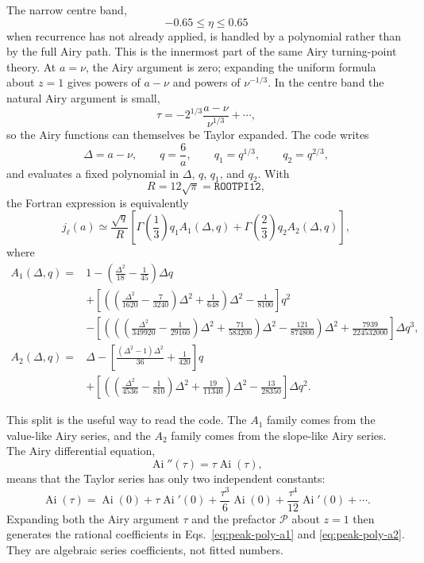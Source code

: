 \documentclass[11pt,a4paper]{article}
\newcommand{\Ai}{\operatorname{Ai}}
\newcommand{\Aip}{\operatorname{Ai}'}
\newcommand{\code}[1]{\texttt{#1}}
\newcommand{\D}{\Delta}
\begin{document}
The narrow centre band,
\begin{equation}
  -0.65\le\eta\le0.65
\end{equation}
when recurrence has not already applied, is handled by a polynomial rather than by the full Airy path.  This is the innermost part of the same Airy turning-point theory.  At $a=\nu$, the Airy argument is zero; expanding the uniform formula about $z=1$ gives powers of $a-\nu$ and powers of $\nu^{-1/3}$.  In the centre band the natural Airy argument is small,
\begin{equation}
  \tau = -2^{1/3}\frac{a-\nu}{\nu^{1/3}}+\cdots ,
\end{equation}
so the Airy functions can themselves be Taylor expanded.  The code writes
\begin{equation}
  \D=a-\nu,
  \qquad q=\frac{6}{a},
  \qquad q_1=q^{1/3},
  \qquad q_2=q^{2/3},
\end{equation}
and evaluates a fixed polynomial in $\D$, $q$, $q_1$, and $q_2$.  With
\begin{equation}
  R=12\sqrt{\pi}=\code{ROOTPI12},
\end{equation}
the Fortran expression is equivalently
\begin{equation}
  j_\ell(a)\simeq
  \frac{\sqrt q}{R}\left[
    \Gamma\!\left(\frac13\right)q_1 A_1(\D,q)
    +\Gamma\!\left(\frac23\right)q_2 A_2(\D,q)
  \right],
  \label{eq:peak-poly-split}
\end{equation}
where
\begin{align}
  A_1(\D,q)={}&1
    -\left(\frac{\D^2}{18}-\frac{1}{45}\right)\D q \nonumber\\
    &+\left[\left(\left(\frac{\D^2}{1620}-\frac{7}{3240}\right)\D^2
        +\frac{1}{648}\right)\D^2-\frac{1}{8100}\right]q^2 \nonumber\\
    &-\left[\left(\left(\left(\frac{\D^2}{349920}-\frac{1}{29160}\right)\D^2
        +\frac{71}{583200}\right)\D^2-\frac{121}{874800}\right)\D^2
        +\frac{7939}{224532000}\right]\D q^3 ,
        \label{eq:peak-poly-a1}\\
  A_2(\D,q)={}&\D
    -\left[\frac{(\D^2-1)\D^2}{36}+\frac{1}{420}\right]q \nonumber\\
    &+\left[\left(\left(\frac{\D^2}{4536}-\frac{1}{810}\right)\D^2
        +\frac{19}{11340}\right)\D^2-\frac{13}{28350}\right]\D q^2 .
        \label{eq:peak-poly-a2}
\end{align}

This split is the useful way to read the code.  The $A_1$ family comes from the value-like Airy series, and the $A_2$ family comes from the slope-like Airy series.  The Airy differential equation,
\begin{equation}
  \Ai''(\tau)=\tau\Ai(\tau),
\end{equation}
means that the Taylor series has only two independent constants:
\begin{equation}
  \Ai(\tau)=\Ai(0)+\tau\Aip(0)+\frac{\tau^3}{6}\Ai(0)+\frac{\tau^4}{12}\Aip(0)+\cdots .
\end{equation}
Expanding both the Airy argument $\tau$ and the prefactor $\mathcal{P}$ about $z=1$ then generates the rational coefficients in Eqs.~\eqref{eq:peak-poly-a1} and \eqref{eq:peak-poly-a2}.  They are algebraic series coefficients, not fitted numbers.
\end{document}
